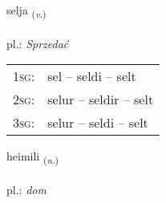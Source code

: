 \documentclass[frontgrid, backgrid]{flacards}\usepackage[]{graphicx}\usepackage[]{xcolor}
\begin{document}
\renewcommand{\blhead}{\vskip5pt {\small\bfseries\footnotesize Sagnorð | czasownik }}
\renewcommand{\bcfoot}{\vskip5pt \hspace{2pt}{\small\bfseries\footnotesize 1K}}


{selja \small{\textsubscript{(\textit{v.})}} \\[1ex] %
\textphonetic{[sɛlja]} \\
pl.: \emph{Sprzedać} \\  [2ex]
\renewcommand*{\arraystretch}{0.8}
\begin{tabular}{p{1cm}l}
\textsc{1sg}: & sel -- seldi -- selt \\ 
\textsc{2sg}: & selur -- seldir -- selt \\ 
\textsc{3sg}: & selur -- seldi -- selt \\ 
\end{tabular}
}

\renewcommand{\flhead}{\vskip5pt \fboxsep=0pt {\small\bfseries\footnotesize Nafnorð | rzeczownik}}
\renewcommand{\fcfoot}{\vskip5pt \fboxsep=0pt \hspace{2pt}{\small\bfseries\footnotesize 1K}}

\renewcommand{\blhead}{\vskip5pt {\small\bfseries\footnotesize Nafnorð | rzeczownik }}
\renewcommand{\bcfoot}{\vskip5pt \hspace{2pt}{\small\bfseries\footnotesize 1K}}


{heimili \small{\textsubscript{(\textit{n.})}} \\[1ex] %
\textphonetic{[heiːmɪlɪ]} \\
pl.: \emph{dom} \\  [2ex]
\renewcommand*{\arraystretch}{0.8}
}

\renewcommand{\flhead}{\vskip5pt \fboxsep=0pt {\small\bfseries\footnotesize Nafnorð | rzeczownik}}
\renewcommand{\fcfoot}{\vskip5pt \fboxsep=0pt \hspace{2pt}{\small\bfseries\footnotesize 1K}}
\end{document}
